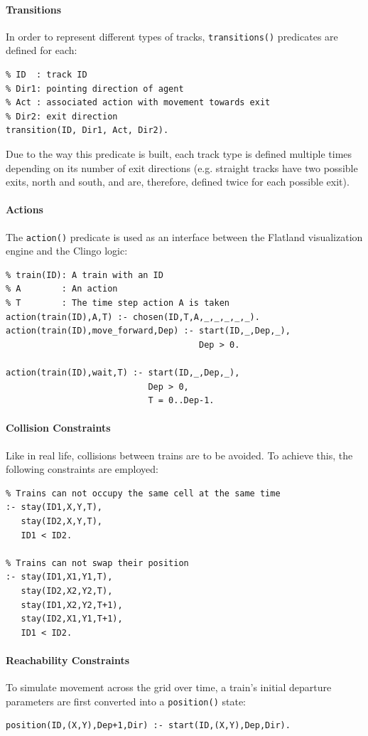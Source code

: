 \documentclass[12pt, a4paper]{llncs}
\begin{document}
\paragraph{Transitions}
In order to represent different types of tracks, \texttt{transitions()} predicates are defined for each:
\begin{verbatim}
% ID  : track ID
% Dir1: pointing direction of agent
% Act : associated action with movement towards exit
% Dir2: exit direction
transition(ID, Dir1, Act, Dir2).
\end{verbatim}
Due to the way this predicate is built, each track type is defined multiple times depending on its number of exit directions (e.g. straight tracks have two possible exits, north and south, and are, therefore, defined twice for each possible exit).

\paragraph{Actions}
The \texttt{action()} predicate is used as an interface between the Flatland visualization engine and the Clingo logic:
\begin{verbatim}
% train(ID): A train with an ID
% A        : An action
% T        : The time step action A is taken
action(train(ID),A,T) :- chosen(ID,T,A,_,_,_,_,_).
action(train(ID),move_forward,Dep) :- start(ID,_,Dep,_),
                                      Dep > 0.
                                      
action(train(ID),wait,T) :- start(ID,_,Dep,_),
                            Dep > 0,
                            T = 0..Dep-1.
\end{verbatim}

\paragraph{Collision Constraints}
Like in real life, collisions between trains are to be avoided. To achieve this, the following constraints are employed:
\begin{verbatim}
% Trains can not occupy the same cell at the same time
:- stay(ID1,X,Y,T),
   stay(ID2,X,Y,T),
   ID1 < ID2.

% Trains can not swap their position
:- stay(ID1,X1,Y1,T),
   stay(ID2,X2,Y2,T),
   stay(ID1,X2,Y2,T+1),
   stay(ID2,X1,Y1,T+1),
   ID1 < ID2.
\end{verbatim}

\paragraph{Reachability Constraints}
To simulate movement across the grid over time, a train's initial departure parameters are first converted into a \texttt{position()} state:
\begin{verbatim}
position(ID,(X,Y),Dep+1,Dir) :- start(ID,(X,Y),Dep,Dir).
\end{verbatim}
\end{document}
